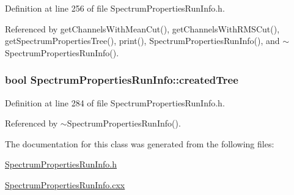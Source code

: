 Definition at line 256 of file Spectrum\-Properties\-Run\-Info.\-h.



Referenced by get\-Channels\-With\-Mean\-Cut(), get\-Channels\-With\-R\-M\-S\-Cut(), get\-Spectrum\-Properties\-Tree(), print(), Spectrum\-Properties\-Run\-Info(), and $\sim$\-Spectrum\-Properties\-Run\-Info().

\hypertarget{class_spectrum_properties_run_info_afcbed8adc08c7cfbca19df402943a770}{
\subsubsection[{created\-Tree}]{\setlength{\rightskip}{0pt plus 5cm}bool Spectrum\-Properties\-Run\-Info\-::created\-Tree\hspace{0.3cm}{\ttfamily [protected]}}}\label{class_spectrum_properties_run_info_afcbed8adc08c7cfbca19df402943a770}


Definition at line 284 of file Spectrum\-Properties\-Run\-Info.\-h.



Referenced by $\sim$\-Spectrum\-Properties\-Run\-Info().



The documentation for this class was generated from the following files\-:\begin{DoxyCompactItemize}
\item 
\hyperlink{_spectrum_properties_run_info_8h}{Spectrum\-Properties\-Run\-Info.\-h}\item 
\hyperlink{_spectrum_properties_run_info_8cxx}{Spectrum\-Properties\-Run\-Info.\-cxx}\end{DoxyCompactItemize}
